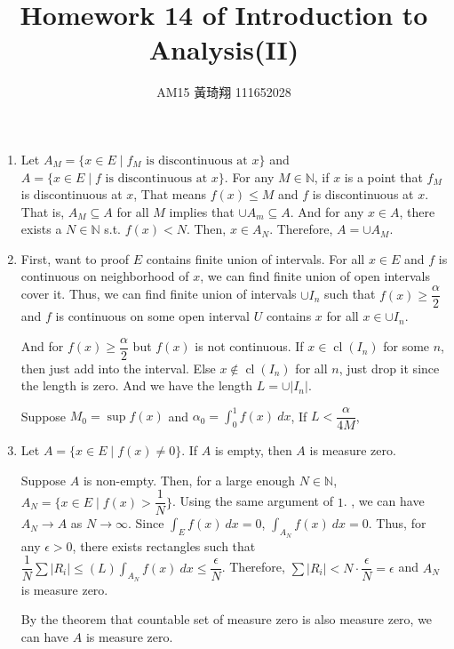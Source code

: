 \documentclass[12pt]{article}
\title{Homework 14 of Introduction to Analysis(II)}
\author{AM15 黃琦翔 111652028}
\DeclareMathOperator{\closure}{cl}
\begin{document}
\maketitle
\begin{enumerate}
    \item Let $A_M = \{x \in E \mid f_M\text{ is discontinuous at } x\}$ and $A = \{ x\in E \mid f\text{ is discontinuous at } x\}$.
    For any $M \in \mathbb{N}$, if $x$ is a point that $f_M$ is discontinuous at $x$, 
    That means $f(x) \leq M$ and $f$ is discontinuous at $x$.
    That is, $A_M \subseteq A$ for all $M$ implies that $\cup A_m \subseteq A$.
    And for any $x \in A$, there exists a $N \in \mathbb{N}$ s.t. $f(x) < N$.
    Then, $x \in A_N$.
    Therefore, $A = \cup A_M$.

    \item First, want to proof $E$ contains finite union of intervals.
    For all $x \in E$ and $f$ is continuous on neighborhood of $x$, 
    we can find finite union of open intervals cover it.
    Thus, we can find finite union of intervals $\cup I_n$ such that $f(x) \geq \dfrac{\alpha}{2}$ 
    and $f$ is continuous on some open interval $U$ contains $x$ for all $x \in \cup I_n$.
    
    And for $f(x) \geq \dfrac{\alpha}{2}$ but $f(x)$ is not continuous.
    If $x \in \closure(I_n)$ for some $n$, then just add into the interval.
    Else $x \notin \closure(I_n)$ for all $n$, just drop it since the length is zero.
    And we have the length $L = \cup |I_n|$.
    
    Suppose $M_0 = \sup f(x)$ and $\alpha_0 = \displaystyle\int_{0}^{1} f(x)\ dx$,
    If $L < \dfrac{\alpha}{4M}$, 
    
    \item Let $A = \{x \in E\mid f(x)\neq 0\}$. If $A$ is empty, then $A$ is measure zero.
    
    Suppose $A$ is non-empty.
    Then, for a large enough $N\in \mathbb{N}$, $A_N = \{x\in E\mid f(x) > \dfrac{1}{N}\}$.
    Using the same argument of $1$. , we can have $A_N \to A$ as $N \to \infty$.
    Since $\displaystyle\int_{E} f(x)\ dx = 0$, $\displaystyle\int_{A_N} f(x)\ dx = 0$.
    Thus, for any $\epsilon > 0$, there exists rectangles such that $\dfrac{1}{N}\sum |R_i| \leq (L)\displaystyle\int_{A_N} f(x)\ dx \leq \dfrac{\epsilon}{N}$.
    Therefore, $\sum |R_i| < N \cdot \dfrac{\epsilon}{N} = \epsilon$ and $A_N$ is measure zero.
    
    By the theorem that countable set of measure zero is also measure zero, we can have $A$ is measure zero.
\end{enumerate}
\end{document}
